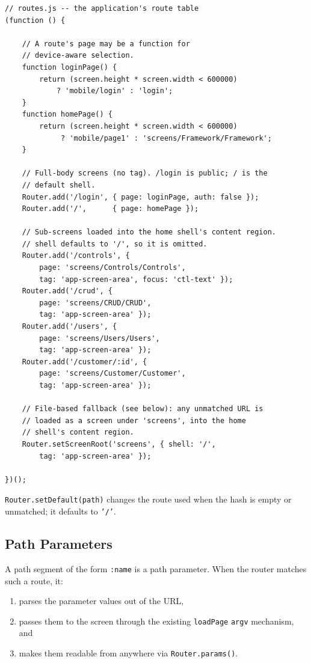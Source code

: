 \begin{lstlisting}[style=javascript]
// routes.js -- the application's route table
(function () {

    // A route's page may be a function for
    // device-aware selection.
    function loginPage() {
        return (screen.height * screen.width < 600000)
            ? 'mobile/login' : 'login';
    }
    function homePage() {
        return (screen.height * screen.width < 600000)
             ? 'mobile/page1' : 'screens/Framework/Framework';
    }

    // Full-body screens (no tag). /login is public; / is the
    // default shell.
    Router.add('/login', { page: loginPage, auth: false });
    Router.add('/',      { page: homePage });

    // Sub-screens loaded into the home shell's content region.
    // shell defaults to '/', so it is omitted.
    Router.add('/controls', {
        page: 'screens/Controls/Controls',
        tag: 'app-screen-area', focus: 'ctl-text' });
    Router.add('/crud', {
        page: 'screens/CRUD/CRUD',
        tag: 'app-screen-area' });
    Router.add('/users', {
        page: 'screens/Users/Users',
        tag: 'app-screen-area' });
    Router.add('/customer/:id', {
        page: 'screens/Customer/Customer',
        tag: 'app-screen-area' });

    // File-based fallback (see below): any unmatched URL is
    // loaded as a screen under 'screens', into the home
    // shell's content region.
    Router.setScreenRoot('screens', { shell: '/',
        tag: 'app-screen-area' });

})();
\end{lstlisting}

\noindent
\texttt{Router.setDefault(path)} changes the route used when the hash is empty or unmatched; it defaults to \texttt{'/'}.

\subsection{Path Parameters}
\label{sec:rs-router-params}

A path segment of the form \texttt{:name} is a path parameter.  When the router matches such a route, it:

\begin{enumerate}
  \item parses the parameter values out of the URL,
  \item passes them to the screen through the existing \texttt{loadPage} \texttt{argv} mechanism, and
  \item makes them readable from anywhere via \texttt{Router.params()}.
\end{enumerate}

